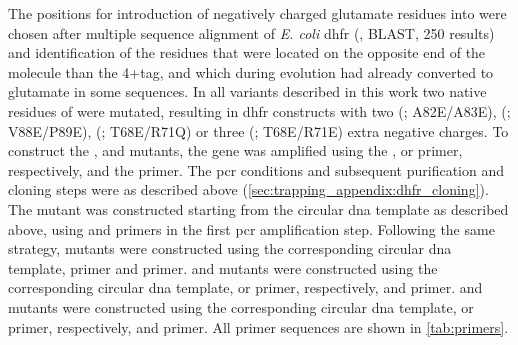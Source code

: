 The positions for introduction of negatively charged glutamate residues into  were chosen after
multiple sequence alignment of \textit{E. coli} \gls{dhfr} (, BLAST, 250 results) and
identification of the residues that were located on the opposite end of the molecule than the 4+tag, and which
during evolution had already converted to glutamate in some sequences. In all  variants described
in this work two native residues of  were mutated, resulting in \gls{dhfr} constructs with two
(; A82E/A83E), (; V88E/P89E), (; T68E/R71Q) or three (;
T68E/R71E) extra negative charges. To construct the ,  and  mutants, the
 gene was amplified using the ,  or  primer, respectively,
and the  primer. The \gls{pcr} conditions and subsequent purification and cloning steps
were as described above (\cref{sec:trapping_appendix:dhfr_cloning}). The  mutant was constructed
starting from the  circular \gls{dna} template as described above, using  and
 primers in the first \gls{pcr} amplification step. Following the same strategy,
 mutants were constructed using the corresponding  circular \gls{dna} template,
 primer and  primer.  and  mutants were
constructed using the corresponding  circular \gls{dna} template,  or  primer, respectively, and  primer.  and  mutants were
constructed using the corresponding  circular \gls{dna} template,  or  primer, respectively, and  primer. All primer sequences are shown in
\cref{tab:primers}.


